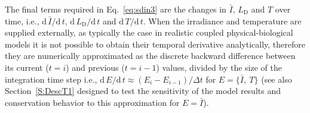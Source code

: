 \documentclass[gmd, manuscript]{copernicus}
\begin{document}
The final terms required in Eq.~\eqref{eq:sdin3} are the changes in $\bar{I}$, $L_{\text{D}}$ and $T$ over time, i.e., $\text{d}\,\bar{I} / \text{d}\,t$, $\text{d}\,L_{\text{D}} / \text{d}\,t$
and $\text{d}\,T / \text{d}\,t$.
When the irradiance and temperature are supplied externally, as typically the case in realistic coupled physical-biological models it is not possible to obtain their temporal derivative analytically, therefore they are numerically approximated as the discrete backward difference between its current ($t=i$) and previous ($t=i-1$) values, divided by the size of the integration time step i.e., $\text{d}\, E / \text{d}\, t \approx (E_{i} - E_{i-1}) / \Delta t$ for $E=\{\bar{I},\ T\}$ (see also Section~\ref{S:DescT1} designed to test the sensitivity of the model results and conservation behavior to this approximation for $E=\bar{I}$).
\end{document}
